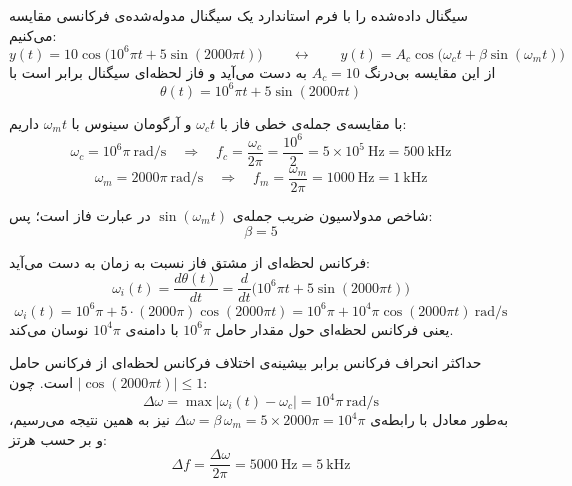 سیگنال  داده‌شده را با فرم استاندارد یک سیگنال مدوله‌شده‌ی فرکانسی مقایسه می‌کنیم:
\[
y(t) = 10\cos\!\big(10^6\pi t + 5\sin(2000\pi t)\big)
\qquad\longleftrightarrow\qquad
y(t) = A_c\cos\!\big(\omega_c t + \beta\sin(\omega_m t)\big)
\]
از این مقایسه بی‌درنگ $A_c = 10$ به دست می‌آید و فاز لحظه‌ای سیگنال برابر است با
\[
\theta(t) = 10^6\pi t + 5\sin(2000\pi t)
\]


با مقایسه‌ی جمله‌ی خطی فاز با $\omega_c t$ و آرگومان سینوس با $\omega_m t$ داریم:
\[
\omega_c = 10^6\pi \ \text{rad/s}
\quad\Longrightarrow\quad
f_c = \frac{\omega_c}{2\pi} = \frac{10^6}{2} = 5\times10^5 \ \text{Hz} = 500 \ \text{kHz}
\]
\[
\omega_m = 2000\pi \ \text{rad/s}
\quad\Longrightarrow\quad
f_m = \frac{\omega_m}{2\pi} = 1000 \ \text{Hz} = 1 \ \text{kHz}
\]


شاخص مدولاسیون ضریب جمله‌ی $\sin(\omega_m t)$ در عبارت فاز است؛ پس:
\[
\beta = 5
\]


فرکانس لحظه‌ای از مشتق فاز نسبت به زمان به دست می‌آید:
\[
\omega_i(t) = \frac{d\theta(t)}{dt}
            = \frac{d}{dt}\Big(10^6\pi t + 5\sin(2000\pi t)\Big)
\]
\[
\omega_i(t) = 10^6\pi + 5\cdot(2000\pi)\cos(2000\pi t)
            = 10^6\pi + 10^4\pi\cos(2000\pi t) \ \text{rad/s}
\]
یعنی فرکانس لحظه‌ای حول مقدار حامل $10^6\pi$ با دامنه‌ی $10^4\pi$ نوسان می‌کند.


حداکثر انحراف فرکانس برابر بیشینه‌ی اختلاف فرکانس لحظه‌ای از فرکانس حامل است. چون $|\cos(2000\pi t)| \leq 1$:
\[
\Delta\omega = \max\big|\omega_i(t) - \omega_c\big| = 10^4\pi \ \text{rad/s}
\]
به‌طور معادل با رابطه‌ی $\Delta\omega = \beta\,\omega_m = 5\times 2000\pi = 10^4\pi$ نیز به همین نتیجه می‌رسیم، و بر حسب هرتز:
\[
\Delta f = \frac{\Delta\omega}{2\pi} = 5000 \ \text{Hz} = 5 \ \text{kHz}
\]
